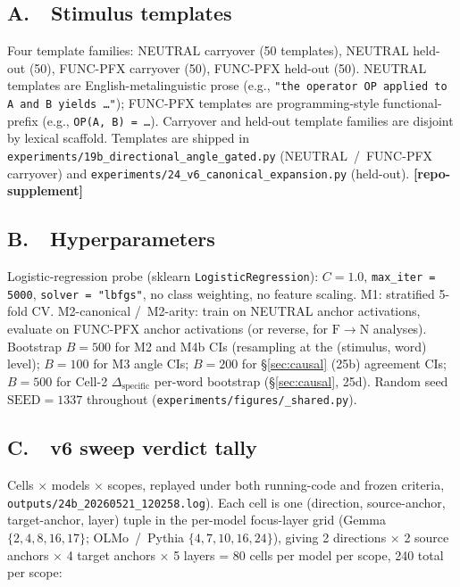 \documentclass[11pt,letterpaper]{article}
\newcommand{\dspec}{\ensuremath{\Delta_{\text{specific}}}}
\newcommand{\FtoN}{\ensuremath{\mathrm{F}\!\to\!\mathrm{N}}}
\newcommand{\Mc}{M2-canonical}
\newcommand{\Ma}{M2-arity}
\newcommand{\Mbfb}{M4b}
\begin{document}
\subsection*{A.\ \ Stimulus templates}
\label{app:templates}
Four template families: NEUTRAL carryover (50 templates), NEUTRAL
held-out (50), FUNC-PFX carryover (50), FUNC-PFX held-out (50).
NEUTRAL templates are English-metalinguistic prose (e.g.,
\texttt{"the operator OP applied to A and B yields \ldots"});
FUNC-PFX templates are programming-style functional-prefix (e.g.,
\texttt{OP(A, B) = \ldots}). Carryover and held-out template
families are disjoint by lexical scaffold. Templates are shipped in
\texttt{experiments/19b\_directional\_angle\_gated.py}
(NEUTRAL~/~FUNC-PFX carryover) and
\texttt{experiments/24\_v6\_canonical\_expansion.py} (held-out).
\textbf{[repo-supplement]}

\subsection*{B.\ \ Hyperparameters}
Logistic-regression probe (sklearn \texttt{LogisticRegression}):
$C = 1.0$, \texttt{max\_iter = 5000}, \texttt{solver = "lbfgs"}, no
class weighting, no feature scaling. M1: stratified 5-fold CV. \Mc{}
/~\Ma{}: train on NEUTRAL anchor activations, evaluate on FUNC-PFX
anchor activations (or reverse, for \FtoN{} analyses). Bootstrap
$B = 500$ for M2 and \Mbfb{} CIs (resampling at the (stimulus, word)
level); $B = 100$ for M3 angle CIs; $B = 200$ for \S\ref{sec:causal}
(25b) agreement CIs; $B = 500$ for Cell-2 \dspec{} per-word bootstrap
(\S\ref{sec:causal}, 25d). Random seed $\text{SEED} = 1337$
throughout (\texttt{experiments/figures/\_shared.py}).

\subsection*{C.\ \ v6 sweep verdict tally}
Cells $\times$ models
$\times$ scopes, replayed under both running-code and frozen
criteria, \texttt{outputs/24b\_20260521\_120258.log}). Each cell is
one (direction, source-anchor, target-anchor, layer) tuple in the
per-model focus-layer grid (Gemma $\{2, 4, 8, 16, 17\}$;
OLMo~/~Pythia $\{4, 7, 10, 16, 24\}$), giving 2 directions $\times$
2 source anchors $\times$ 4 target anchors $\times$ 5 layers = 80
cells per model per scope, 240 total per scope:
\end{document}
